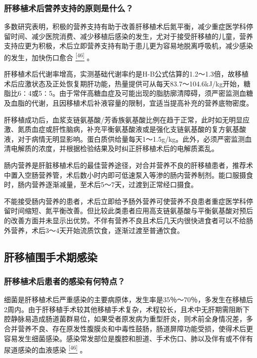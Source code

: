 \subsubsection{肝移植术后营养支持的原则是什么？}

多数研究表明，积极的营养支持有助于改善肝移植术后氮平衡，减少重症医学科停留时间、减少医院消费、减少移植后感染的发生，尤对于接受肝移植的儿童，营养支持应更为积极，术后立即营养支持有助于患儿更为容易地脱离呼吸机，减少感染的发生，加快伤口愈合
\protect\hyperlink{text00020.htmlux5cux23ch46-19}{\textsuperscript{{[}46{]}}}
。

肝移植术后代谢率增高，实测基础代谢率约是H-B公式估算的1.2～1.3倍，故移植术后应激状态及正处恢复期肝功能，热量提供可从每天83.7～104.6kJ/kg开始，糖脂比6∶4或5∶5。由于常伴高糖血症及可能出现的脂肪廓清障碍，须严密监测血糖及血脂的代谢，且因移植术后补液容量的限制，宜适当提高补充的营养底物密度。

肝移植成功后，血浆支链氨基酸/芳香族氨基酸比例在趋于正常，此时如无明显应激、氮质血症或肝性脑病，补充平衡氨基酸液或是强化支链氨基酸的复方氨基酸液，对于病情无明显影响。蛋白质供给量每天1～1.5g/kg。此外，必须严密监测血清电解质的浓度，并根据检验结果及时纠正肝移植术后的电解质紊乱。

肠内营养是肝脏移植术后的最佳营养途径，对合并营养不良的肝移植患者，推荐术中置入空肠营养管，术后数小时内即可低速泵入等渗的肠内营养制剂。能口服摄食时，肠内营养逐渐减量，至术后5～7天，过渡到正常经口摄食。

不能接受肠内营养的患者，术后立即给予肠外营养可使营养不良患者重症医学科停留时间缩短、氮平衡改善。但比较此类患者应用高支链氨基酸与平衡氨基酸对预后的改善方面并未显示出优势。不伴有营养不良且术后几天内很快进食者可以不给肠外营养，术后3～4天开始流质饮食，逐渐过渡至普通饮食。

\subsection{肝移植围手术期感染}

\subsubsection{肝移植术后患者的感染有何特点？}

细菌是肝移植术后严重感染的主要病原体，发生率是35％～70％，多发生在移植后2周内。由于肝移植手术较其他移植手术复杂，术程较长，且术中无肝期需阻断下腔静脉易造成肠道菌群易位，如果受者原发病为重型肝炎，则术前全身情况差，多合并营养不良、存在原发性腹膜炎和中毒性鼓肠，肠道屏障功能受损，使得术后更容易发生细菌感染。感染常发部位是腹腔和胆道、手术伤口、肺以及伴有或不伴有尿道感染的血液感染
\protect\hyperlink{text00020.htmlux5cux23ch46-19}{\textsuperscript{{[}46{]}}}
。

